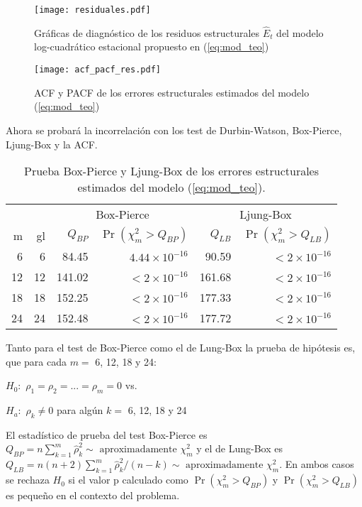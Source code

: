 \documentclass[11pt, letterpaper, twoside]{article}
\begin{document}
\begin{figure}
\centering
\texttt{[image: residuales.pdf]}
\caption{Gráficas de diagnóstico de los residuos estructurales $\hat{E}_t$ del modelo log-cuadrático estacional propuesto en (\ref{eq:mod_teo})}
\label{fig:residuales}
\end{figure}

\begin{figure}
\centering
\texttt{[image: acf\_pacf\_res.pdf]}
\caption{ACF y PACF de los errores estructurales estimados del modelo (\ref{eq:mod_teo})}
\label{fig:acf_pacf_res}
\end{figure}

Ahora se probará la incorrelación con los test de Durbin-Watson, Box-Pierce, Ljung-Box y la ACF.

\begin{table}[ht!]
\caption{Prueba Box-Pierce y Ljung-Box de los errores estructurales estimados del modelo (\ref{eq:mod_teo}).}
\label{tab:res_mod_bp_lb}
\centering
\begin{tabular}{rrrrrr}
& & \multicolumn{2}{c}{Box-Pierce} & \multicolumn{2}{c}{Ljung-Box} \\
\cline{3-6}
m & gl & $Q_{BP}$ & \small{$\Pr(\chi_m^2 >Q_{BP})$} & $Q_{LB}$ & \small{$\Pr(\chi_m^2 >Q_{LB})$} \\
  \hline
6 & 6 & 84.45 & $4.44\times10^{-16}$ & 90.59 & $<2\times10^{-16}$ \\
  12 & 12 & 141.02 & $<2\times10^{-16}$ & 161.68 & $<2\times10^{-16}$ \\
  18 & 18 & 152.25 & $<2\times10^{-16}$ & 177.33 & $<2\times10^{-16}$ \\
  24 & 24 & 152.48 & $<2\times10^{-16}$ & 177.72 & $<2\times10^{-16}$ \\
   \hline
\end{tabular}
\end{table}

Tanto para el test de Box-Pierce como el de Lung-Box la prueba de hipótesis es, que para cada $m=$ 6, 12, 18 y 24:

$H_0:$ $\rho_1=\rho_2=...=\rho_m=0$ vs.

$H_a:$ $\rho_k \neq 0$ para algún $k=$ 6, 12, 18 y 24

El estadístico de prueba del test Box-Pierce es $Q_{BP}=n \sum_{k=1}^m \hat{\rho}_k^2 \sim \text{ aproximadamente } \chi_m^2$ y el de Lung-Box es $Q_{LB}=n(n+2) \sum_{k=1}^m \hat{\rho}_k^2/(n-k) \sim \text{ aproximadamente } \chi_m^2$. En ambos casos se rechaza $H_0$ si el valor p calculado como $\Pr(\chi_m^2 >Q_{BP})$ y $\Pr(\chi_m^2 >Q_{LB})$ es pequeño en el contexto del problema.
\end{document}
